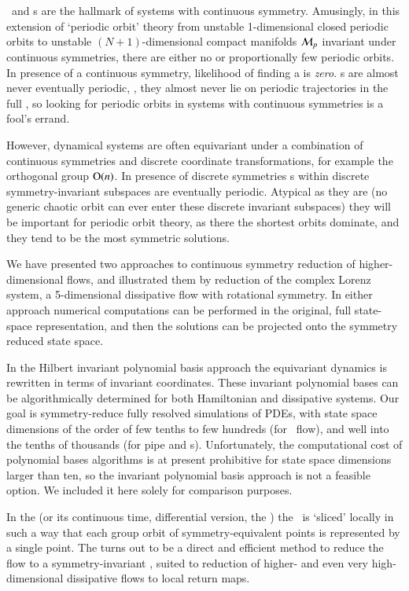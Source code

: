 {\Reqva\ and \rpo s are the hallmark of systems with
continuous symmetry. Amusingly, in this extension of
`periodic orbit' theory from unstable 1-dim\-ens\-ion\-al
closed periodic orbits to unstable
$(N\!+\!1)$-dim\-ens\-ion\-al compact manifolds ${\cal M}_p$
invariant under continuous symmetries, there are either no or
proportionally few periodic orbits. In presence of a
continuous symmetry, likelihood of finding a {\po} is {\em
zero}. \Rpo s are almost never eventually periodic, \ie, they
almost never lie on periodic trajectories in the full
{\statesp}, so looking for periodic orbits in systems with
continuous symmetries is a fool's errand.

However, dynamical systems are often equivariant under a
combination of continuous symmetries and discrete coordinate
transformations, for example the
orthogonal group $\textrm{O}(n)$. In presence of discrete
symmetries \rpo s within discrete symmetry-invariant
subspaces are eventually periodic. Atypical as they are (no
generic chaotic orbit can ever enter these discrete invariant
subspaces) they will be important for periodic orbit theory, as
there the shortest orbits dominate, and they tend to be the
most symmetric solutions.
    } %


We have presented two approaches to continuous symmetry
reduction of higher-dimensional flows, and illustrated them
by reduction of the complex Lorenz system, a 5-dimensional
dissipative flow with rotational symmetry.
In either approach numerical computations can be performed in
the original, full state-space representation, and then the
solutions can be projected onto the symmetry reduced state
space.

In the Hilbert invariant polynomial basis approach the
equivariant dynamics is rewritten in terms of invariant
coordinates. These invariant polynomial bases can be
algorithmically determined for both Hamiltonian and
dissipative systems. Our goal is symmetry-reduce fully
resolved simulations of PDEs, with state space dimensions of
the order of few tenths to few hundreds (for \KS\ flow), and
well into the tenths of thousands (for pipe and \pCf s).
Unfortunately, the computational cost of polynomial bases
algorithms is at present prohibitive for state space
dimensions larger than ten, so the invariant polynomial basis
approach is not a feasible option. We included it here solely
for comparison purposes.

In the {\mframes} (or its continuous time, differential
version, the \mslices) the \statesp\ is `sliced' locally in
such a way that each group orbit of symmetry-equivalent
points is represented by a single point. The {\mframes} turns
out to be a direct and efficient method to reduce the flow to
a symmetry-invariant \reducedsp, suited to reduction of
higher- and even very high-dimensional dissipative flows to
local return maps.

